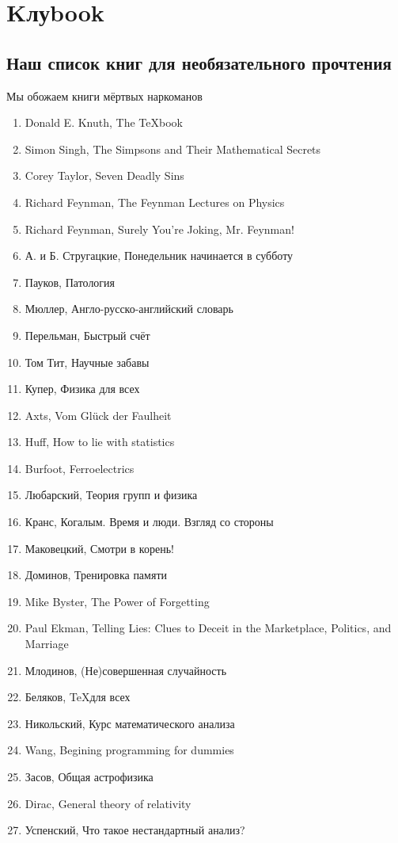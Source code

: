 \section*{Kлуbook} 
\subsection*{Наш список книг для необязательного прочтения} %
\begin{epigraph}
    Мы обожаем книги мёртвых наркоманов
\end{epigraph}

\begin{enumerate}
    \item Donald E. Knuth, The {\TeX}book
    \item Simon Singh, The Simpsons and Their Mathematical Secrets
    \item Corey Taylor, Seven Deadly Sins 
    \item Richard Feynman, The Feynman Lectures on Physics
    \item Richard Feynman, Surely You're Joking, Mr. Feynman!
    \item А. и Б. Стругацкие, Понедельник начинается в субботу
    \item Пауков, Патология
    \item Мюллер, Англо-русско-английский словарь
    \item Перельман, Быстрый счёт
    \item Том Тит, Научные забавы
    \item Купер, Физика для всех
    \item Axts,  Vom Gl\"uck der Faulheit 
    \item Huff, How to lie with statistics
    \item Burfoot, Ferroelectrics
    \item Любарский, Теория групп и физика
    \item Кранс, Когалым. Время и люди. Взгляд со стороны
    \item Маковецкий, Смотри в корень!
    \item Доминов, Тренировка памяти
    \item Mike Byster, The Power of Forgetting
    \item Paul Ekman, Telling Lies: Clues to Deceit in the Marketplace, Politics, and Marriage
    \item Млодинов, (Не)совершенная случайность
    \item Беляков, \TeX для всех
    \item Никольский, Курс математического анализа
    \item Wang, Begining programming for dummies
    \item Засов, Общая астрофизика
    \item Dirac, General theory of relativity
    \item Успенский, Что такое нестандартный анализ?
\end{enumerate}


